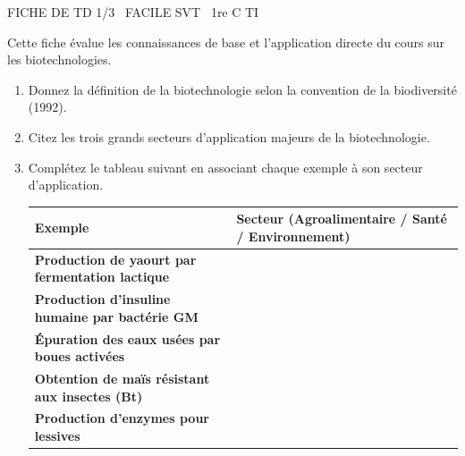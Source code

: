\documentclass[11pt]{article}
\begin{document}
\begin{tcolorbox}[enhanced,colback=popink,colframe=popink,arc=10pt,boxrule=0pt,left=12pt,right=12pt,top=9pt,bottom=9pt]
{\color{white}\popxbold\small FICHE DE TD 1/3 \textbullet\ FACILE \hfill SVT \textbullet\ 1re C TI\par}
\end{tcolorbox}
\vspace{4pt}
Cette fiche évalue les connaissances de base et l'application directe du cours sur les biotechnologies.

\begin{exercice}
\begin{enumerate}
    \item Donnez la définition de la biotechnologie selon la convention de la biodiversité (1992).
    \item Citez les trois grands secteurs d'application majeurs de la biotechnologie.
    \item Complétez le tableau suivant en associant chaque exemple à son secteur d'application.
    \begin{tabularx}{\linewidth}{>{\bfseries}l X}
        Exemple & Secteur (Agroalimentaire / Santé / Environnement) \\
        \hline
        Production de yaourt par fermentation lactique & \\
        Production d'insuline humaine par bactérie GM & \\
        Épuration des eaux usées par boues activées & \\
        Obtention de maïs résistant aux insectes (Bt) & \\
        Production d'enzymes pour lessives & \\
    \end{tabularx}
\end{enumerate}
\end{exercice}
\end{document}
